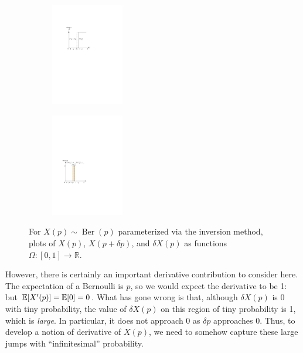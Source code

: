 \begin{figure}[t]
    \centering
    \begin{subfigure}[b]{0.4\textwidth}
        \centering 
        \includegraphics[height=4.5cm]{figures/ber1_for_matrixcalc.pdf}
        \label{fig:ber1} 
    \end{subfigure} 
    \begin{subfigure}[b]{0.4\textwidth}
        \centering
        \includegraphics[height=4.5cm]{figures/ber2_for_matrixcalc.pdf}
        \label{fig:ber2}
    \end{subfigure}
    \caption{For $X(p) \sim \operatorname{Ber}(p)$ parameterized via the inversion method, 
    plots of $X(p)$, $X(p+\delta p)$, and $\delta X(p)$ as functions $\Omega: [0, 1] \to \mathbb{R}$. }
\end{figure}


However, there is certainly an important derivative contribution to consider here. 
The expectation of a Bernoulli is $p$, so we would expect the derivative to be 1: but $\mathbb E[X'(p)] = \mathbb E[0] = 0$. What has gone wrong is that, although $\delta X(p)$ is 0 with tiny probability, the value of $\delta X(p)$
on this region of tiny probability is 1, which is \emph{large}. In particular, it does not approach 0 as $\delta p$
approaches 0. Thus, to develop a notion of derivative of $X(p)$, we need to somehow capture these large jumps with ``infinitesimal''
probability. 

